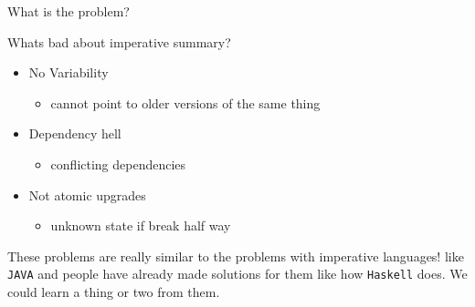 \documentclass[presentation]{beamer}
\begin{document}
\begin{frame}[label={sec:org38cfab4},fragile]{What is the problem?}
\begin{block}{Whats bad about imperative summary?}
\begin{itemize}
\item No Variability
\begin{itemize}
\item cannot point to older versions of the same thing
\end{itemize}
\item Dependency hell
\begin{itemize}
\item conflicting dependencies
\end{itemize}
\item Not atomic upgrades
\begin{itemize}
\item unknown state if break half way
\end{itemize}
\end{itemize}
These problems are really similar to the problems with imperative languages!
like \texttt{JAVA} and people have already made solutions for them like how \texttt{Haskell}
does. We could learn a thing or two from them.
\end{block}
\end{frame}
\end{document}
